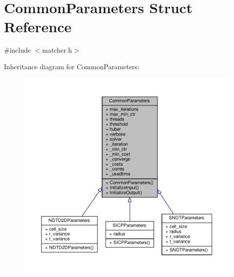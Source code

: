 \hypertarget{structCommonParameters}{}\section{Common\+Parameters Struct Reference}
\label{structCommonParameters}


{\ttfamily \#include $<$matcher.\+h$>$}



Inheritance diagram for Common\+Parameters\+:\nopagebreak
\begin{figure}[H]
\begin{center}
\leavevmode
\includegraphics[width=350pt]{d4/dd2/structCommonParameters__inherit__graph}
\end{center}
\end{figure}


